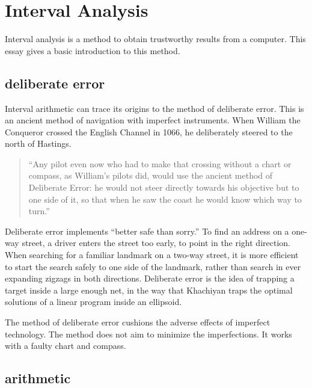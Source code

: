 \section{Interval Analysis}%
\label{sec:bounds-simplex}

Interval analysis is a method to obtain trustworthy results from a computer.
This essay gives a basic introduction to this method.

\subsection{deliberate error}

Interval arithmetic can trace its origins to the method of deliberate error.
This is an ancient method of navigation with imperfect instruments.  When William
the Conqueror
crossed the English Channel in 1066, he deliberately steered to the north of Hastings.

\begin{quote}
``Any pilot even now who had to make that crossing without a chart or compass,
as William's pilots did, would use the ancient method of Deliberate Error: he would
not steer directly towards his objective but to one side of it, so that when he
saw the coast he would know which way to turn.'' \cite[p81]{How81}
\end{quote}

Deliberate error implements ``better safe than sorry.''
To find an address on a one-way street,  a  driver enters the
street too early, to point in the right direction.  
When searching for a familiar landmark
on a two-way street, it is more efficient  
to start the search safely to one side of the landmark, 
rather than search in ever
expanding zigzags in both directions.  
Deliberate error 
is the idea of trapping a target inside a large enough net, in the
way that
Khachiyan traps the optimal solutions of a linear program inside
an ellipsoid.


The method of deliberate error cushions the adverse effects of imperfect technology.
The method does not aim to minimize the imperfections.  It works with a faulty
chart and compass.

\subsection{arithmetic}

